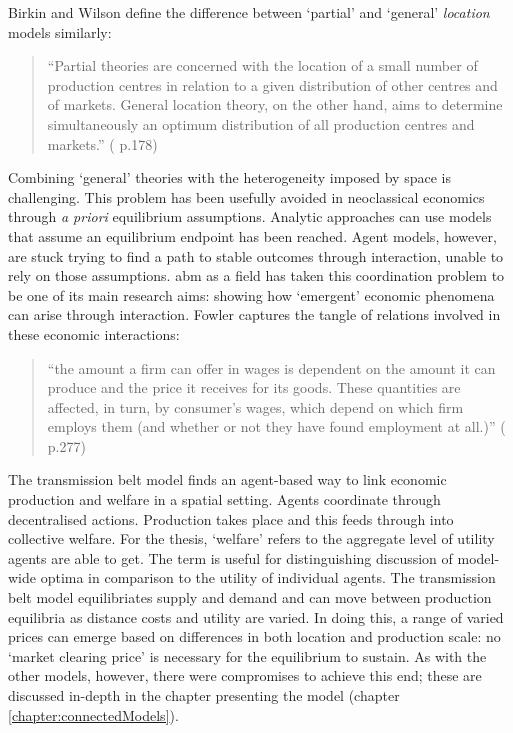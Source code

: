 Birkin and Wilson define the difference between `partial' and `general'  \emph{location} models similarly:

\begin{quote}
``Partial theories are concerned with the location of a small number of production centres in relation to a given distribution of other centres and of markets. General location theory, on the other hand, aims to determine simultaneously an optimum distribution of all production centres and markets.'' (\citealt{birkin_industrial_1986} p.178)
\end{quote}

Combining `general' theories with the heterogeneity imposed by space is challenging. This problem has been usefully avoided in neoclassical economics through \emph{a priori} equilibrium assumptions. Analytic approaches can use models that assume an equilibrium endpoint has been reached. Agent models, however, are stuck trying to find a path to stable outcomes through interaction, unable to rely on those assumptions. \gls{abm} as a field has taken this coordination problem to be one of its main research aims: showing how `emergent' economic phenomena can arise through interaction. Fowler captures the tangle of relations involved in these economic interactions:

\begin{quote}
``the amount a firm can offer in wages is dependent on the amount it can produce and the price it receives for its goods. These quantities are affected, in turn, by consumer's wages, which depend on which firm employs them (and whether or not they have found employment at all.)'' (\citealt{fowler_taking_2007} p.277)
\end{quote}

The transmission belt model finds an agent-based way to link economic production and welfare in a spatial setting. Agents coordinate through decentralised actions. Production takes place and this feeds through into collective welfare. For the thesis, `welfare' refers to the aggregate level of utility agents are able to get. The term is useful for distinguishing discussion of model-wide optima in comparison to the utility of individual agents. The transmission belt model equilibriates supply and demand and can move between production equilibria as distance costs and utility are varied. In doing this, a range of varied prices can emerge based on differences in both location and production scale: no `market clearing price' is necessary for the equilibrium to sustain. As with the other models, however, there were compromises to achieve this end; these are discussed in-depth in the chapter presenting the model (chapter \ref{chapter:connectedModels}).

